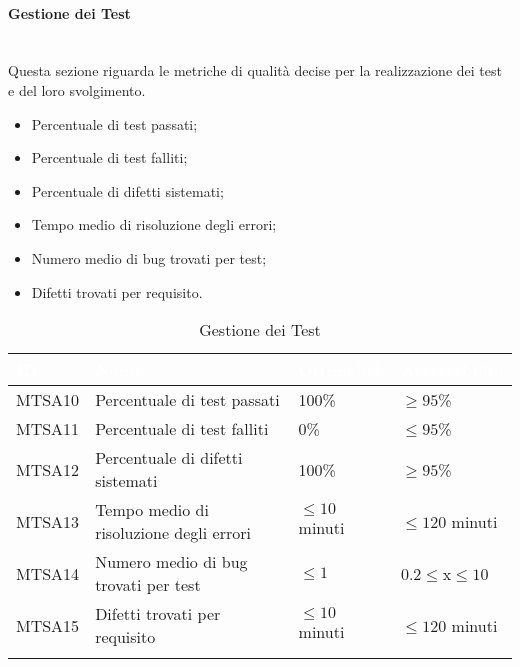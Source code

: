 \paragraph{Gestione dei Test}\-\\
Questa sezione riguarda le metriche di qualità decise per la realizzazione dei test e del loro svolgimento. 

\begin{itemize}
	\item Percentuale di test passati;
	\item Percentuale di test falliti;
	\item Percentuale di difetti sistemati;
	\item Tempo medio di risoluzione degli errori;
	\item Numero medio di bug trovati per test;
	\item Difetti trovati per requisito.
\end{itemize}

\begin{longtable}{|C{.15\textwidth}|C{.24\textwidth}|C{.24\textwidth}|C{.24\textwidth}|}
\hline
{}\textbf{\textcolor{white}{ID}} & \textbf{\textcolor{white}{Nome}} & \textbf{\textcolor{white}{Ottimalità}} & \textbf{\textcolor{white}{Accettabilità}}\\
\hline \hline
\endfirsthead
MTSA10 & Percentuale di test passati & 100\% & $\geq 95$\%\\
\hline
{}MTSA11 & Percentuale di test falliti & 0\% & $\leq 95$\%\\
\hline
MTSA12 & Percentuale di difetti sistemati & 100\% & $\geq 95$\%\\
\hline
{}MTSA13 & Tempo medio di risoluzione degli errori & $\leq 10$ minuti & $\leq 120$ minuti\\
\hline
MTSA14 & Numero medio di bug trovati per test & $\leq 1$ & 0.2$\leq$x$\leq 10$  \\
\hline
{}MTSA15 & Difetti trovati per requisito & $\leq 10$ minuti & $\leq 120$ minuti\\
\hline
\caption{Gestione dei Test}
\label{GestioneTest}
\end{longtable}